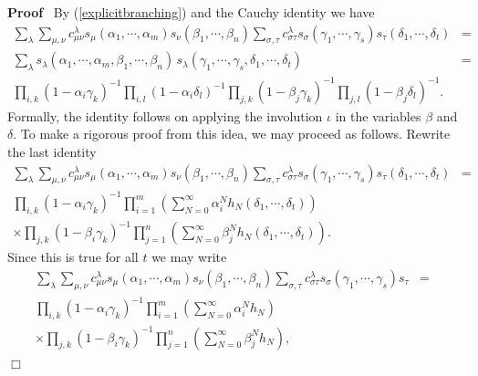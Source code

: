 \documentclass[11pt]{amsart}
\renewenvironment{proof}{
\noindent\textbf{Proof}\ }{\hspace*{\fill}
\begin{math}\Box\end{math}\medskip}
\begin{document}
\begin{proof}
By (\ref{explicitbranching}) and the Cauchy identity we have
\begin{eqnarray*}
   \sum_{\lambda} \sum_{\mu, \nu} c_{\mu \nu}^{\lambda} s_{\mu} ( \alpha_1,
   \cdots, \alpha_m ) s_{\nu} ( \beta_1, \cdots, \beta_n ) \sum_{\sigma,
   \tau} c_{\sigma \tau}^{\lambda} s_{\sigma} ( \gamma_1, \cdots, \gamma_s )
   s_{\tau} ( \delta_1, \cdots, \delta_t ) & = \\
   \sum_{\lambda} s_{\lambda} ( \alpha_1, \cdots, \alpha_m, \beta_1, \cdots,
   \beta_n ) \, s_{\lambda} ( \gamma_1, \cdots, \gamma_s, \delta_1, \cdots,
   \delta_t ) & = & \\
   \prod_{i, k} ( 1 - \alpha_i \gamma_k )^{- 1} \prod_{i, l} ( 1 - \alpha_i
   \delta_l )^{- 1} \prod_{j, k} ( 1 - \beta_j \gamma_k )^{- 1} \prod_{j, l}
   ( 1 - \beta_j \delta_l )^{- 1} . & &
\end{eqnarray*}
Formally, the identity follows on applying the involution $\iota$
in the variables $\beta$ and $\delta$. To make a rigorous proof
from this idea, we may proceed as follows. Rewrite the last
identity
\begin{eqnarray*}
   \sum_{\lambda} \sum_{\mu, \nu} c_{\mu \nu}^{\lambda} s_{\mu} ( \alpha_1,
   \cdots, \alpha_m ) s_{\nu} ( \beta_1, \cdots, \beta_n ) \sum_{\sigma,
   \tau} c_{\sigma \tau}^{\lambda} s_{\sigma} ( \gamma_1, \cdots, \gamma_s )
   s_{\tau} ( \delta_1, \cdots, \delta_t ) & = & \\
   \prod_{i, k} ( 1 - \alpha_i \gamma_k )^{- 1} \prod_{i = 1}^m \left(
   \sum_{N = 0}^{\infty} \alpha_i^N h_N ( \delta_1, \cdots, \delta_t )
   \right) &  & \\
   \times \prod_{j, k} ( 1 - \beta_i \gamma_k )^{- 1} \prod_{j = 1}^n \left(
   \sum_{N = 0}^{\infty} \beta_j^N h_N ( \delta_1, \cdots, \delta_t ) \right)
   . &  &
\end{eqnarray*}
Since this is true for all $t$ we may write
\begin{eqnarray*}
   \sum_{\lambda} \sum_{\mu, \nu} c_{\mu \nu}^{\lambda} s_{\mu} ( \alpha_1,
   \cdots, \alpha_m ) s_{\nu} ( \beta_1, \cdots, \beta_n ) \sum_{\sigma,
   \tau} c_{\sigma \tau}^{\lambda} s_{\sigma} ( \gamma_1, \cdots, \gamma_s )
   s_{\tau} & = & \\
   \prod_{i, k} ( 1 - \alpha_i \gamma_k )^{- 1} \prod_{i = 1}^m \left(
   \sum_{N = 0}^{\infty} \alpha_i^N h_N \right) &  & \\
   \times \prod_{j, k} ( 1 - \beta_i \gamma_k )^{- 1} \prod_{j = 1}^n \left(
   \sum_{N = 0}^{\infty} \beta_j^N h_N \right), &  &

\end{eqnarray*}
\end{proof}
\end{document}
